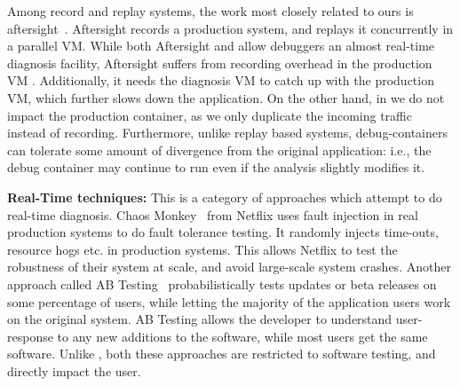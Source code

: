 Among record and replay systems, the work most closely related to ours is aftersight~\cite{aftersight}. 
Aftersight records a production system, and replays it concurrently in a parallel VM.
While both Aftersight and \parikshan allow debuggers an almost real-time diagnosis facility, Aftersight suffers from recording overhead in the production VM .
Additionally, it needs the diagnosis VM to catch up with the production VM, which further slows down the application.
On the other hand, in \parikshan we do not impact the production container, as we only duplicate the incoming traffic instead of recording.
Furthermore, unlike replay based systems, \parikshan debug-containers can tolerate some amount of divergence from the original application: i.e., the debug container may continue to run even if the analysis slightly modifies it.
  
\iffalse
\textbf{Distributed System Debugging:}
Production systems oftem employ light weight instrumentation tools~\cite{magpie,clue,vpath} to capture traces like system calls, transaction or event traces.
Some of these like VPath~\cite{vpath} use end-to-end trace event stitching to capture flows across multiple tiers to infer performance bugs.
While the instrumentation for these tools have a low overhead, the corresponding granularity of the logs is also less.
This limits the diagnosis capability of these tools, and they are only able to give a hint towards the bug root-cause rather than debug it completely.
\fi

\textbf{Real-Time techniques:}
This is a category of approaches which attempt to do real-time diagnosis.
Chaos Monkey~\cite{chaosmonkey} from Netflix uses fault injection in real production systems to do fault tolerance testing.
It randomly injects time-outs, resource hogs etc. in production systems. 
This allows Netflix to test the robustness of their system at scale, and avoid large-scale system crashes.  
Another approach called AB Testing~\cite{abtesting} probabilistically tests updates or beta releases on some percentage of users, 
while letting the majority of the application users work on the original system.
AB Testing allows the developer to understand user-response to any new additions to the software, while most users get the same software.
Unlike \parikshan, both these approaches are restricted to software testing, and directly impact the user.


